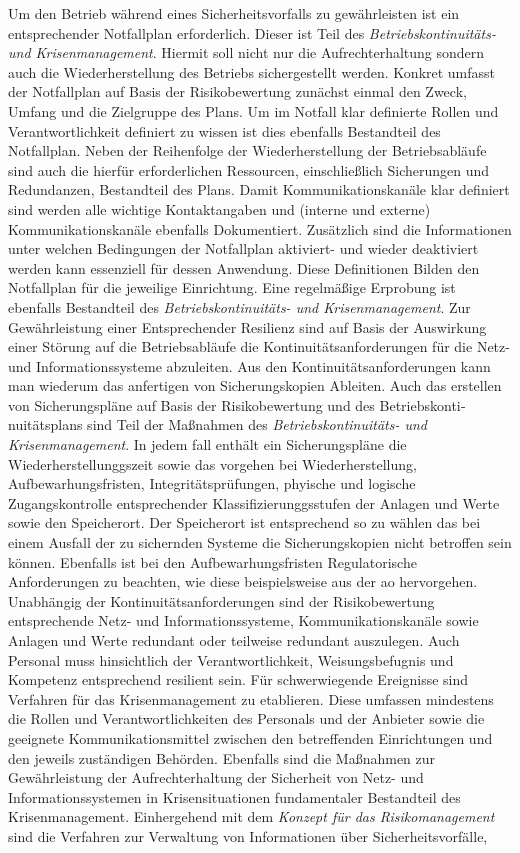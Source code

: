 \documentclass[11pt,a4paper,hidelinks]{article}   %
\begin{document}

                Um den Betrieb während eines Sicherheitsvorfalls zu gewährleisten ist ein entsprechender Notfallplan erforderlich. Dieser ist Teil des \emph{Betriebskontinuitäts- und Krisenmanagement}. Hiermit soll nicht nur die Aufrechterhaltung sondern auch die Wiederherstellung des Betriebs sichergestellt werden. Konkret umfasst der Notfallplan auf Basis der Risikobewertung zunächst einmal den Zweck, Umfang und die Zielgruppe des Plans. Um im Notfall klar definierte Rollen und Verantwortlichkeit definiert zu wissen ist dies ebenfalls Bestandteil des Notfallplan. Neben der Reihenfolge der Wiederherstellung der Betriebsabläufe sind auch die hierfür erforderlichen Ressourcen, einschließlich Sicherungen und Redundanzen, Bestandteil des Plans. Damit Kommunikationskanäle klar definiert sind werden alle wichtige Kontaktangaben und (interne und externe) Kommunikationskanäle ebenfalls Dokumentiert. Zusätzlich sind die Informationen unter welchen Bedingungen der Notfallplan aktiviert- und wieder deaktiviert werden kann essenziell für dessen Anwendung. Diese Definitionen Bilden den Notfallplan für die jeweilige Einrichtung. Eine regelmäßige Erprobung ist ebenfalls Bestandteil des \emph{Betriebskontinuitäts- und Krisenmanagement}. Zur Gewährleistung einer Entsprechender Resilienz sind auf Basis der Auswirkung einer Störung auf die Betriebsabläufe die Kontinuitätsanforderungen für die Netz- und Informationssysteme abzuleiten. Aus den Kontinuitätsanforderungen kann man wiederum das anfertigen von Sicherungskopien Ableiten. Auch das erstellen von Sicherungspläne auf Basis der Risikobewertung und des Betriebskonti­nuitätsplans sind Teil der Maßnahmen des \emph{Betriebskontinuitäts- und Krisenmanagement}. In jedem fall enthält ein Sicherungspläne die Wiederherstellunggszeit sowie das vorgehen bei Wiederherstellung, Aufbewarhungsfristen, Integritätsprüfungen, phyische und logische Zugangskontrolle entsprechender Klassifizierunggsstufen der Anlagen und Werte sowie den Speicherort. Der Speicherort ist entsprechend so zu wählen das bei einem Ausfall der zu sichernden Systeme die Sicherungskopien nicht betroffen sein können. Ebenfalls ist bei den Aufbewarhungsfristen Regulatorische Anforderungen zu beachten, wie diese beispielsweise aus der \gls{ao} hervorgehen. Unabhängig der Kontinuitätsanforderungen sind der Risikobewertung entsprechende Netz- und Informationssysteme, Kommunikationskanäle sowie Anlagen und Werte redundant oder teilweise redundant auszulegen. Auch Personal muss hinsichtlich der Verantwortlichkeit, Weisungsbefugnis und Kompetenz entsprechend resilient sein. Für schwerwiegende Ereignisse sind Verfahren für das Krisenmanagement zu etablieren. Diese umfassen mindestens die Rollen und Verantwortlichkeiten des Personals und der Anbieter sowie die geeignete Kommunikationsmittel zwischen den betreffenden Einrichtungen  und den jeweils zuständigen Behörden. Ebenfalls sind die Maßnahmen zur Gewährleistung der Aufrechterhaltung der Sicherheit von Netz- und Informationssystemen in Krisensituationen fundamentaler Bestandteil des Krisenmanagement. Einhergehend mit dem \emph{Konzept für das Risikomanagement} sind die Verfahren zur Verwaltung von Informationen über Sicherheitsvorfälle, 
\end{document}
